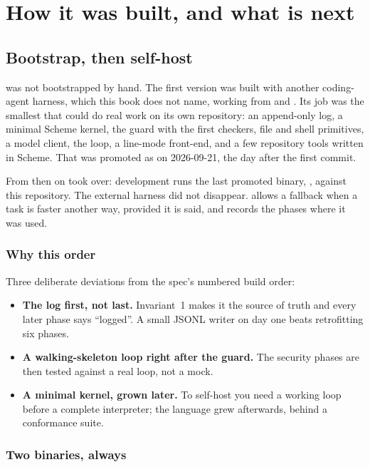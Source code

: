 \part{How it was built, and what is next}

\chapter{Bootstrap, then self-host}

\nodwyn{} was not bootstrapped by hand. The first version was built with
another coding-agent harness, which this book does not name, working from
 and . Its job was the smallest \nodwyn{} that
could do real work on its own repository: an append-only log, a minimal
Scheme kernel, the guard with the first checkers, file and shell
primitives, a model client, the loop, a line-mode front-end, and a few
repository tools written in Scheme. That was promoted as
 on 2026-09-21, the day after the first commit.

From then on \nodwyn{} took over: development runs the last promoted
binary, , against this repository. The external harness
did not disappear.  allows a fallback when a task is faster another
way, provided it is said, and  records the phases where it was
used.

\section{Why this order}

Three deliberate deviations from the spec's numbered build order:

\begin{itemize}
\item \textbf{The log first, not last.} Invariant~1 makes it the source of
  truth and every later phase says ``logged''. A small JSONL writer on day
  one beats retrofitting six phases.
\item \textbf{A walking-skeleton loop right after the guard.} The security
  phases are then tested against a real loop, not a mock.
\item \textbf{A minimal kernel, grown later.} To self-host you need a
  working loop before a complete interpreter; the language grew afterwards,
  behind a conformance suite.
\end{itemize}

\section{Two binaries, always}

